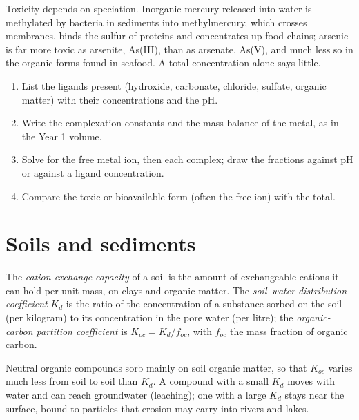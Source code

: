 Toxicity depends on speciation. Inorganic mercury released into water is
methylated by bacteria in sediments into methylmercury, which crosses membranes,
binds the sulfur of proteins and concentrates up food chains; arsenic is far more
toxic as arsenite, As(III), than as arsenate, As(V), and much less so in the organic
forms found in seafood. A total concentration alone says little.

\begin{method}\label{met:b3:environmental-toxicology:speciation}
\begin{enumerate}
  \item List the ligands present (hydroxide, carbonate, chloride, sulfate, organic
        matter) with their concentrations and the pH.
  \item Write the complexation constants and the mass balance of the metal, as in the
        Year 1 volume.
  \item Solve for the free metal ion, then each complex; draw the fractions against
        pH or against a ligand concentration.
  \item Compare the toxic or bioavailable form (often the free ion) with the total.
\end{enumerate}
\end{method}

\section{Soils and sediments}

\begin{definition}\label{def:b3:environmental-toxicology:soil}
The \emph{cation exchange capacity} of a soil is
the amount of exchangeable cations it can hold per unit mass, on clays and organic
matter. The \emph{soil--water distribution coefficient}
$K_d$ is the ratio of the concentration of a substance
sorbed on the soil (per kilogram) to its concentration in the pore water (per
litre); the \emph{organic-carbon partition coefficient}
is $K_{oc} = K_d/f_{oc}$, with $f_{oc}$ the mass fraction of organic carbon.
\end{definition}

Neutral organic compounds sorb mainly on soil organic matter, so that $K_{oc}$ varies
much less from soil to soil than $K_d$. A compound with a small $K_d$ moves with water
and can reach groundwater (leaching); one with a large $K_d$ stays near the surface,
bound to particles that erosion may carry into rivers and lakes.

